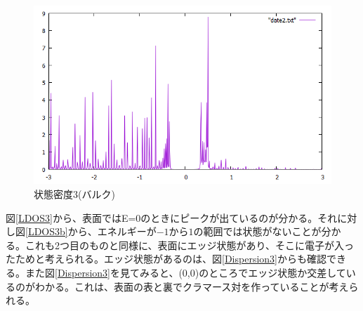 \documentclass{jsarticle}
\begin{document}
            \begin{figure}[H]
                \centering
                \includegraphics[scale=0.5]{LDOS3b_bry.png}
                \caption{状態密度3(バルク)}
                \label{LDOS3b}
            \end{figure}
        
         	図\eqref{LDOS3}から、表面ではE=0のときにピークが出ているのが分かる。それに対し図\eqref{LDOS3b}から、エネルギーが$-1$から$1$の範囲では状態がないことが分かる。これも2つ目のものと同様に、表面にエッジ状態があり、そこに電子が入ったためと考えられる。エッジ状態があるのは、図\eqref{Dispersion3}からも確認できる。また図\eqref{Dispersion3}を見てみると、(0,0)のところでエッジ状態か交差しているのがわかる。これは、表面の表と裏でクラマース対を作っていることが考えられる。

    
\end{document}

